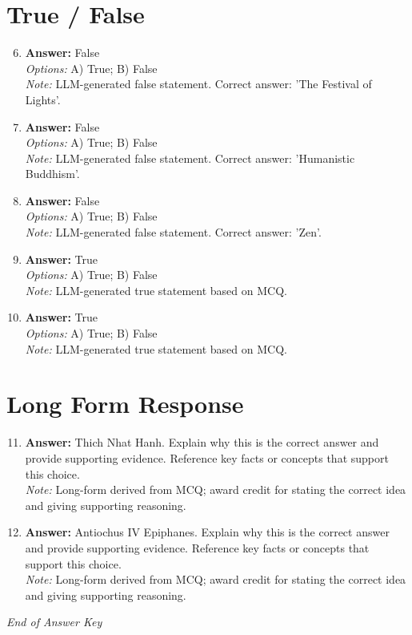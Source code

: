 \documentclass[12pt]{article}
\begin{document}
\section*{True / False}
\begin{enumerate}[label=\arabic*.]
\setcounter{enumi}{5}
\item \textbf{Answer:} False
\\ \textit{Options:} A) True; B) False
\\ \textit{Note:} LLM-generated false statement. Correct answer: 'The Festival of Lights'.
\item \textbf{Answer:} False
\\ \textit{Options:} A) True; B) False
\\ \textit{Note:} LLM-generated false statement. Correct answer: 'Humanistic Buddhism'.
\item \textbf{Answer:} False
\\ \textit{Options:} A) True; B) False
\\ \textit{Note:} LLM-generated false statement. Correct answer: 'Zen'.
\item \textbf{Answer:} True
\\ \textit{Options:} A) True; B) False
\\ \textit{Note:} LLM-generated true statement based on MCQ.
\item \textbf{Answer:} True
\\ \textit{Options:} A) True; B) False
\\ \textit{Note:} LLM-generated true statement based on MCQ.
\end{enumerate}

\section*{Long Form Response}
\begin{enumerate}[label=\arabic*.]
\setcounter{enumi}{10}
\item \textbf{Answer:} Thich Nhat Hanh. Explain why this is the correct answer and provide supporting evidence. Reference key facts or concepts that support this choice.
\\ \textit{Note:} Long-form derived from MCQ; award credit for stating the correct idea and giving supporting reasoning.
\item \textbf{Answer:} Antiochus IV Epiphanes. Explain why this is the correct answer and provide supporting evidence. Reference key facts or concepts that support this choice.
\\ \textit{Note:} Long-form derived from MCQ; award credit for stating the correct idea and giving supporting reasoning.
\end{enumerate}

\vfill
\noindent\textit{End of Answer Key}
\end{document}

